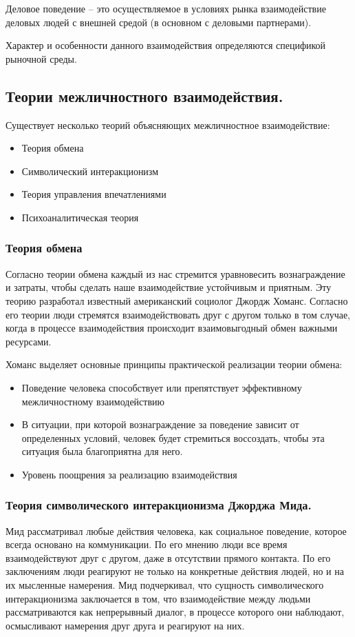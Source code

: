 Деловое поведение – это осуществляемое в условиях рынка взаимодействие деловых людей с внешней средой (в основном с деловыми партнерами).

Характер и особенности данного взаимодействия определяются спецификой рыночной среды.

\subsection{Теории межличностного взаимодействия.}

Существует несколько теорий объясняющих  межличностное взаимодействие:
\begin{itemize}
    \item Теория обмена
    \item Символический интеракционизм
    \item Теория управления впечатлениями
    \item Психоаналитическая теория
\end{itemize}

\subsubsection{Теория обмена}
Согласно теории обмена каждый из нас стремится уравновесить вознаграждение и  затраты, чтобы сделать наше взаимодействие устойчивым и приятным.
Эту теорию разработал известный американский социолог Джордж Хоманс.
Согласно его теории люди стремятся взаимодействовать друг с другом только в том случае, когда в процессе взаимодействия происходит взаимовыгодный обмен важными ресурсами.

Хоманс выделяет основные принципы практической реализации теории обмена:
\begin{itemize}
    \item Поведение человека способствует или препятствует эффективному межличностному взаимодействию 
    \item В ситуации, при которой вознаграждение за поведение зависит от определенных условий, человек будет стремиться воссоздать, чтобы эта ситуация была благоприятна для него.
    \item Уровень поощрения за реализацию взаимодействия
\end{itemize}

\subsubsection{Теория символического интеракционизма Джорджа Мида.}
Мид рассматривал любые действия человека, как социальное поведение, которое всегда основано на коммуникации. По его мнению люди все время взаимодействуют друг с другом, даже в отсутствии прямого контакта.
По его заключениям люди реагируют не только на конкретные действия людей, но и на их мысленные намерения.
Мид подчеркивал, что сущность символического интеракционизма заключается в том, что взаимодействие между людьми рассматриваются как непрерывный диалог, в процессе которого они наблюдают, осмысливают намерения друг друга и реагируют на них.

